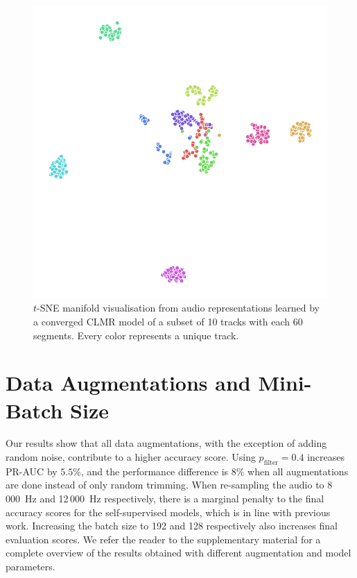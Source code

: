 \begin{figure}[t]
    \centering
    \includegraphics[width=0.75\columnwidth]{figs/tsne-clmr.png}
    \caption{$t$-SNE manifold visualisation from audio representations learned by a converged CLMR model of a subset of 10 tracks with each 60 segments. Every color represents a unique track.}
    \label{fig:tsne_manifold}
\end{figure}



\section{Data Augmentations and Mini-Batch Size}
Our results show that all data augmentations, with the exception of adding random noise, contribute to a higher accuracy score. Using $p_{\mathrm{filter}}=0.4$ increases PR-AUC by $5.5\%$, and the performance difference is $8\%$ when all augmentations are done instead of only random trimming. When re-sampling the audio to 8\,000~Hz and 12\,000~Hz respectively, there is a marginal penalty to the final accuracy scores for the self-supervised models, which is in line with previous work\cite{lee2018samplecnn}. Increasing the batch size to 192 and 128 respectively also increases final evaluation scores. We refer the reader to the supplementary material for a complete overview of the results obtained with different augmentation and model parameters.

